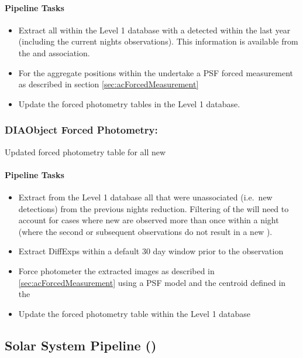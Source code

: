 \paragraph{Pipeline Tasks}

\begin{itemize}
\item Extract all \DIAObjects within the Level 1 database with a detected \DIASource within the last year (including the current nights observations). This information is available from the \DIASource and \DIAObject association.
\item For the aggregate positions within the \DIAObject undertake a PSF forced measurement as described in section \ref{sec:acForcedMeasurement}
\item Update the forced photometry tables in the Level 1 database.
\end{itemize}



\subsubsection{DIAObject Forced Photometry:}

Updated forced photometry table for all new \DIAObjects


\paragraph{Pipeline Tasks}

\begin{itemize}
\item Extract from the Level 1 database all \DIAObjects that were unassociated (i.e.\ new \DIASource detections) from the previous nights reduction. Filtering of the \DIAObjects will need to account for cases where new \DIASources are observed more than once within a night (where the second or subsequent observations do not result in a new \DIAObject).
\item Extract DiffExps within a  default 30 day window prior to the observation
\item Force photometer the extracted images as described in \ref{sec:acForcedMeasurement} using a PSF model and the centroid defined in the \DIAObject
\item Update the forced photometry table within the Level 1 database
\end{itemize}
\clearpage



\subsection{Solar System Pipeline (\wbsMOPS)}
\label{sec:apMovingObjectPipeline}

